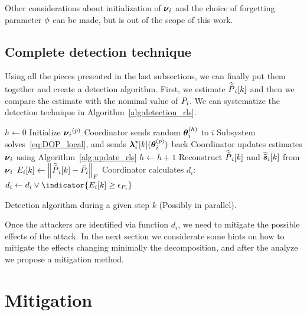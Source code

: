 \documentclass[../main.tex]{subfiles}
\begin{document}
\begin{remark}
  Other considerations about initialization of ${\boldsymbol{\nu}_{i}}$ and the choice of forgetting parameter ${\phi}$ can be made, but is out of the scope of this work.
\end{remark}

\subsection{Complete detection technique}\label{sec:compl-detect-algor}
Using all the pieces presented in the last subsections, we can finally put them together and create a detection algorithm.
First, we estimate $\widehat{\tilde{P}}_{i}[k]$ and then we compare the estimate with the nominal value of ${P}_{i}$.
We can systematize the detection technique in Algorithm~\ref{alg:detection_rls}.

\begin{algorithm2e}[h]
  \DontPrintSemicolon%
  $h\gets0$\;
  Initialize ${\boldsymbol{\nu}_{i}}^{(p)}$
  \Repeat{$\norm{\rlsparam\hplusone-\rlsparam\h}\leq\epsilon_{\rlsparam}$}
  {
    Coordinator sends random $\boldsymbol{\theta}_i^{(h)}$ to $i$ \;
    Subsystem solves~\eqref{eq:DOP_local}, and sends $\lambdaikstar(\thetai\p)$ back\;
    Coordinator updates estimates ${\boldsymbol{\nu}_{i}}$ using Algorithm~\ref{alg:update_rls}\;
    $h\gets h+1$\;
  }
  Reconstruct $\widehat{\tilde{P}}_{i}[k]$ and $\widehat{\tilde{\boldsymbol{s}}}_{i}[k]$ from ${\boldsymbol{\nu}_{i}}$\;
  $E_{i}[k]\gets\left\lVert\widehat{\tilde{P}}_{i}[k]-\bar{{P}}_{i}\right\rVert_{F}$\;
  Coordinator calculates $d_{i}$: $d_{i}\gets d_{i}\lor \indicator{E_{i}[k]\geq\epsilon_{\Plin}}$\;

  \caption{Detection algorithm during a given step $k$ (Possibly in parallel).}\label{alg:detection_rls}
\end{algorithm2e}

Once the attackers are identified via function $d_{i}$, we need to mitigate the possible effects of the attack.
In the next section we considerate some hints on how to mitigate the effects changing minimally the decomposition, and after the analyze we propose a mitigation method.

\section{Mitigation}\label{sec:mitigation}
\end{document}
